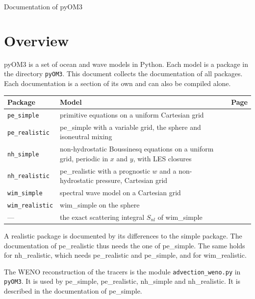 \documentclass[12pt]{article}
\begin{document}
\begin{center}
{\LARGE Documentation of pyOM3}
\end{center}

\tableofcontents
\clearpage

{}
\section*{Overview}

pyOM3 is a set of ocean and wave models in Python.
Each model is a package in the directory \verb|pyOM3|.
This document collects the documentation of all packages.
Each documentation is a section of its own and can also be compiled alone.

\begin{longtable}{@{}lp{8.6cm}r@{}}
\hline
Package & Model & Page \\
\hline
\endhead
\verb|pe_simple| & primitive equations on a uniform Cartesian grid & \pageref{doc:pe_simple} \\
\verb|pe_realistic| & pe\_simple with a variable grid, the sphere and isoneutral mixing & \pageref{doc:pe_realistic} \\
\verb|nh_simple| & non-hydrostatic Boussinesq equations on a uniform grid, periodic in $x$ and $y$, with LES closures & \pageref{doc:nh_simple} \\
\verb|nh_realistic| & pe\_realistic with a prognostic $w$ and a non-hydrostatic pressure, Cartesian grid & \pageref{doc:nh_realistic} \\
\verb|wim_simple| & spectral wave model on a Cartesian grid & \pageref{doc:wim_simple} \\
\verb|wim_realistic| & wim\_simple on the sphere & \pageref{doc:wim_realistic} \\
--- & the exact scattering integral $S_{nl}$ of wim\_simple & \pageref{doc:wim_snl_exact} \\
\hline
\end{longtable}

A realistic package is documented by its differences to the simple package.
The documentation of pe\_realistic thus needs the one of pe\_simple.
The same holds for nh\_realistic, which needs pe\_realistic and pe\_simple, and for wim\_realistic.

The WENO reconstruction of the tracers is the module \verb|advection_weno.py| in \verb|pyOM3|.
It is used by pe\_simple, pe\_realistic, nh\_simple and nh\_realistic.
It is described in the documentation of pe\_simple.
\end{document}
